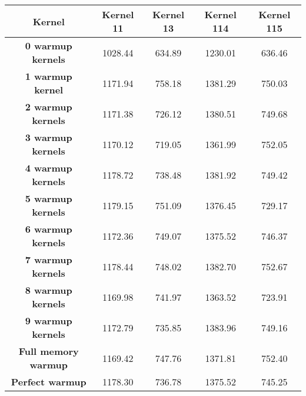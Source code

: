 \begin{tabular}{ |c|c|c|c|c |}
    \hline
    \textbf{Kernel} & Kernel 11 & Kernel 13 & Kernel 114 & Kernel 115 \\
    \hline
    \hline
    \textbf{0 warmup kernels} & 1028.44 & 634.89 & 1230.01 & 636.46 \\
    \textbf{1 warmup kernel} & 1171.94 & 758.18 & 1381.29 & 750.03 \\
    \textbf{2 warmup kernels} & 1171.38 & 726.12 & 1380.51 & 749.68 \\
    \textbf{3 warmup kernels} & 1170.12 & 719.05 & 1361.99 & 752.05 \\
    \textbf{4 warmup kernels} & 1178.72 & 738.48 & 1381.92 & 749.42 \\
    \textbf{5 warmup kernels} & 1179.15 & 751.09 & 1376.45 & 729.17 \\
    \textbf{6 warmup kernels} & 1172.36 & 749.07 & 1375.52 & 746.37 \\
    \textbf{7 warmup kernels} & 1178.44 & 748.02 & 1382.70 & 752.67 \\
    \textbf{8 warmup kernels} & 1169.98 & 741.97 & 1363.52 & 723.91 \\
    \textbf{9 warmup kernels} & 1172.79 & 735.85 & 1383.96 & 749.16 \\
    \textbf{Full memory warmup} & 1169.42 & 747.76 & 1371.81 & 752.40 \\
    \textbf{Perfect warmup} & 1178.30 & 736.78 & 1375.52 & 745.25 \\
    \hline
\end{tabular}